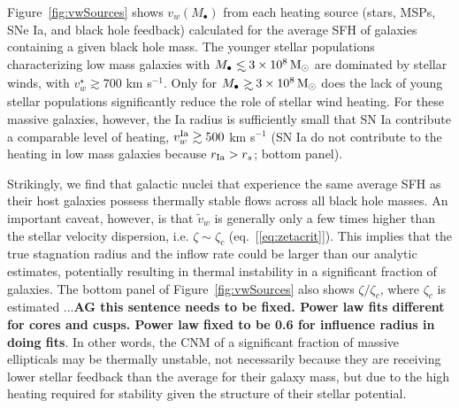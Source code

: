 \documentclass[usenatbib,fleqn]{mn2e}
\newcommand\lsim{\mathrel{\rlap{\lower4pt\hbox{\hskip1pt$\sim$}}
    \raise1pt\hbox{$<$}}}
\newcommand\gsim{\mathrel{\rlap{\lower4pt\hbox{\hskip1pt$\sim$}}
    \raise1pt\hbox{$>$}}}
\newcommand{\rs}{r_s}
\newcommand{\vw}{\tilde{v}_{w}}
\newcommand{\Mbh}[1][]{M_{\bullet#1}}
\newcommand{\vwO}{v_{w}}
\begin{document}
Figure~\ref{fig:vwSources} shows $\vwO(M_{\bullet})$ from each heating
source (stars, MSPs, SNe Ia, and black hole feedback) calculated for
the average SFH of galaxies containing a given black hole mass.  The
younger stellar populations characterizing low mass galaxies with $\Mbh\lsim
3\times 10^{8} \Msun$ are dominated by stellar winds, with
$v_{w}^{\star} \gtrsim 700$ km s$^{-1}$.  Only for $\Mbh\gsim 3\times
10^{8} \Msun$ does the lack of young stellar populations significantly
reduce the role of stellar wind heating.  For these massive
galaxies, however, the Ia radius is sufficiently small that SN Ia contribute
a comparable level of heating, $v_{w}^{\rm Ia} \gtrsim 500$ km
s$^{-1}$ (SN Ia do not contribute to the heating in low mass galaxies because $r_{\rm Ia} > \rs$; bottom panel).  

Strikingly, we find that galactic nuclei that experience the same
average SFH as their host galaxies possess thermally stable flows
across all black hole masses.  An important caveat, however, is that
$\vw$ is generally only a few times higher than the stellar velocity
dispersion, i.e. $\zeta \sim \zeta_c$ (eq.~[\ref{eq:zetacrit}]).  This
implies that the true stagnation radius and the inflow rate could
be larger than our analytic estimates, potentially resulting in
thermal instability in a significant fraction of galaxies.  The bottom
panel of Figure~\ref{fig:vwSources} also shows $\zeta/\zeta_c$, where
$\zeta_c$ is estimated ...{\bf AG this sentence needs to be
  fixed. Power law fits different for cores and cusps. Power law fixed
to be 0.6 for influence radius in doing fits}.  In other words, the CNM of a
significant fraction of massive ellipticals may be thermally unstable,
not necessarily because they are receiving lower stellar feedback than
the average for their galaxy mass, but due to the high heating
required for stability given the structure of their stellar potential.
\end{document}
